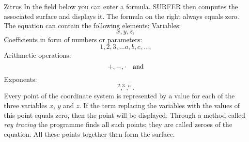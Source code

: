 \begin{surferPage}{Zitrus}
In the field below you can enter a formula. SURFER then computes the associated surface and displays it. The formula on the right always equals zero.
\\
The equation can contain the following elements:
\newline
Variables:
\[x, y, z, \]
Coefficients in form of numbers or parameters:
\[1, 2, 3, \dots a, b, c, \dots, \]
Arithmetic operations:
\[+,  - , \cdot \quad \textnormal{and} \]
Exponents:
\[ ^2, ^3, ^n .\]
Every point of the coordinate system is represented by a value for each of the three variables  $x$, $y$ and $z$. If the term replacing the variables with the values of this point equals zero, then the point will be displayed. Through a method called \textit{ray tracing} the programme finds all such points; they are called zeroes of the equation. All these points together then form the surface.
\end{surferPage}
